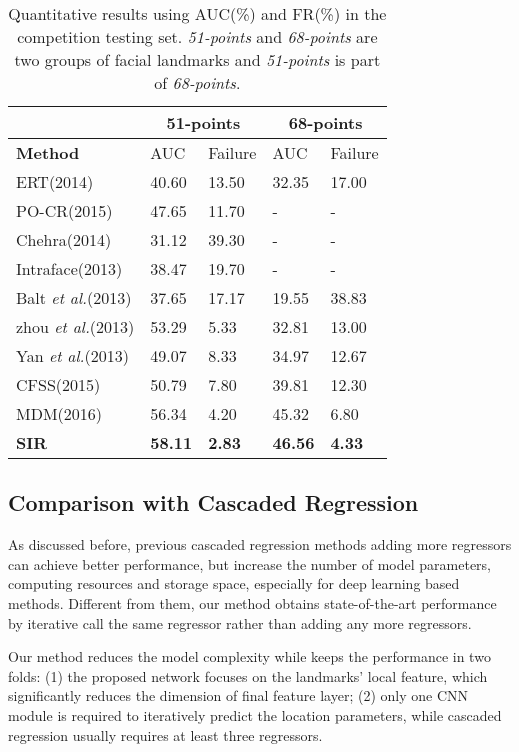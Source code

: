 \documentclass[letterpaper]{article} \usepackage{aaai18}  \usepackage{times}  \usepackage{helvet}  \usepackage{courier}  \usepackage{url}  \usepackage{graphicx}
\def\etal{{\em et al.}}
\begin{document}
\begin{table}[h]
\centering
\caption{Quantitative results using AUC(\%) and FR(\%) in the  competition testing set. \emph{51-points} and \emph{68-points} are two groups of facial landmarks and \emph{51-points} is part of \emph{68-points}.}
\setlength{\tabcolsep}{8pt}
\label{tab:auc:failure}
\centering
\footnotesize{
  \begin{tabular}{l|l l|l l}
    {} &
      \multicolumn{2}{c|}{\textbf{51-points}} & \multicolumn{2}{c}{\textbf{68-points}} \\
    \hline
    \textbf{Method} & AUC & Failure & AUC & Failure \\
    \hline
ERT(2014) & 40.60 & 13.50 & 32.35 & 17.00 \\
    PO-CR(2015) & 47.65 & 11.70 & - & - \\
    Chehra(2014) & 31.12 & 39.30 & - & - \\
    Intraface(2013) & 38.47 & 19.70 & - & - \\ 
    Balt \etal(2013) & 37.65 & 17.17 & 19.55 & 38.83 \\
    zhou \etal(2013) & 53.29 & 5.33 & 32.81 & 13.00 \\
    Yan \etal(2013) & 49.07 & 8.33 & 34.97 & 12.67 \\
    CFSS(2015) & 50.79 & 7.80 & 39.81 & 12.30 \\
    MDM(2016) & 56.34 & 4.20 & 45.32 & 6.80 \\
    \hline
    \textbf{SIR} & \textbf{58.11} & \textbf{2.83} & \textbf{46.56} & \textbf{4.33} \\
    \hline
  \end{tabular}}
\end{table}

\subsection{Comparison with Cascaded Regression}
As discussed before, previous cascaded regression methods adding more regressors can achieve better performance, but increase the number of model parameters, computing resources and storage space, especially for deep learning based methods. Different from them, our method obtains state-of-the-art performance by iterative call the same regressor rather than adding any more regressors.

Our method reduces the model complexity while keeps the performance in two folds: (1) the proposed network focuses on the landmarks' local feature, which significantly reduces the dimension of final feature layer; (2) only one CNN module is required to iteratively predict the location parameters, while cascaded regression usually requires at least three regressors\cite{Trigeorgis:MDM:CVPR16,Xiong:SDM:CVPR2013}. 
\end{document}
